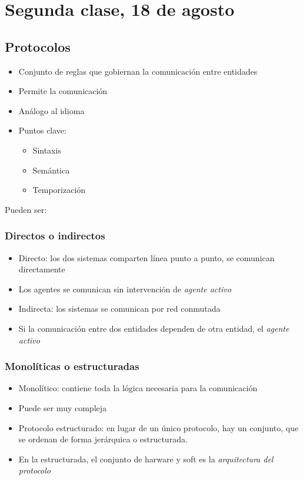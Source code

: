\section{Segunda clase, 18 de agosto}

\subsection{Protocolos}

\begin{itemize}
    \item Conjunto de reglas que gobiernan la comunicación entre entidades
    \item Permite la comunicación
    \item Análogo al idioma
    \item Puntos clave:
    \begin{itemize}
        \item Sintaxis
        \item Semántica
        \item Temporización
    \end{itemize}
\end{itemize}

Pueden ser:
\subsubsection{Directos o indirectos} 
\begin{itemize}
    \item Directo: los dos sistemas comparten línea punto a punto,
    se comunican directamente
    \item Los agentes se comunican sin intervención de \textit{agente activo}
    \item Indirecta: los sistemas se comunican por red conmutada
    \item Si la comunicación entre dos entidades dependen de otra entidad,
    el \textit{agente activo}
\end{itemize}

\subsubsection{Monolíticas o estructuradas} 
\begin{itemize}
    \item Monolítico: contiene toda la lógica necesaria para la comunicación 
    \item Puede ser muy compleja
    \item Protocolo estructurado: en lugar de un único protocolo,
    hay un conjunto, que se ordenan de forma jerárquica o estructurada.
    \item En la estructurada, el conjunto de harware y soft es la \textit{arquitectura del protocolo}
\end{itemize}

